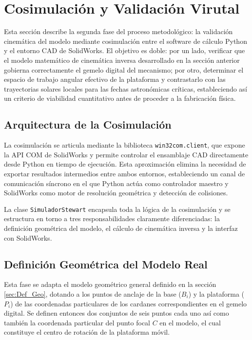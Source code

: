 \section{Cosimulación y Validación Virutal}
\label{sec:cosimulacion}

Esta sección describe la segunda fase del proceso metodológico: la validación cinemática del modelo mediante cosimulación entre el software de cálculo Python y el entorno \gls{CAD} de SolidWorks. El objetivo es doble: por un lado, verificar que el modelo matemático de cinemática inversa desarrollado en la sección anterior gobierna correctamente el gemelo digital del mecanismo; por otro, determinar el espacio de trabajo angular efectivo de la plataforma y contrastarlo con las trayectorias solares locales para las fechas astronómicas críticas, estableciendo así un criterio de viabilidad cuantitativo antes de proceder a la fabricación física.

\subsection{Arquitectura de la Cosimulación}

La cosimulación se articula mediante la biblioteca \texttt{win32com.client}, que expone la \gls{API} \gls{COM} de SolidWorks y permite controlar el ensamblaje CAD directamente desde Python en tiempo de ejecución. Esta aproximación elimina la necesidad de exportar resultados intermedios entre ambos entornos, estableciendo un canal de comunicación síncrono en el que Python actúa como controlador maestro y SolidWorks como motor de resolución geométrica y detección de colisiones.

La clase \texttt{SimuladorStewart} encapsula toda la lógica de la cosimulación y se estructura en torno a tres responsabilidades claramente diferenciadas: la definición geométrica del modelo, el cálculo de cinemática inversa y la interfaz con SolidWorks.

\subsection{Definición Geométrica del Modelo Real}

Esta fase se adapta el modelo geométrico general definido en la sección \ref{sec:Def_Geo}, dotando a los puntos de anclaje de la base ($B_i$) y la plataforma ($P_i$) de las coordenadas particulares de los cardanes correspondientes en el gemelo digital. Se definen entonces dos conjuntos de seis puntos cada uno así como también la coordenada particular del punto focal $C$ en el modelo, el cual constituye el centro de rotación de la plataforma móvil.

